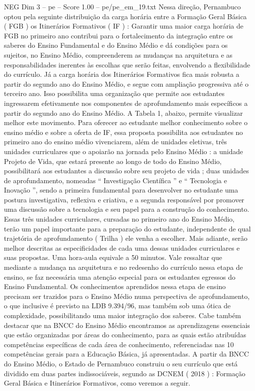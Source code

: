 \begin{textsample}{NEG Dim 3 – pe – Score 1.00 – pe/pe\_em\_19.txt}
Nessa direção, Pernambuco optou pela seguinte distribuição da carga horária entre a Formação Geral Básica ( FGB ) os Itinerários Formativos ( IF ) : Garantir uma maior carga horária de FGB no primeiro ano contribui para o fortalecimento da integração entre os saberes do Ensino Fundamental e do Ensino Médio e dá condições para os sujeitos, no Ensino Médio, compreenderem as mudanças na arquitetura e as responsabilidades inerentes às escolhas que serão feitas, envolvendo a flexibilidade do currículo.
Já a carga horária dos Itinerários Formativos fica mais robusta a partir do segundo ano do Ensino Médio, e segue com ampliação progressiva até o terceiro ano.
Isso possibilita uma organização que permite aos estudantes ingressarem efetivamente nos componentes de aprofundamento mais específicos a partir do segundo ano do Ensino Médio.
A Tabela 1, abaixo, permite visualizar melhor este movimento.
Para oferecer ao estudante melhor conhecimento sobre o ensino médio e sobre a oferta de IF, essa proposta possibilita aos estudantes no primeiro ano do ensino médio vivenciarem, além de unidades eletivas, três unidades curriculares que o apoiarão na jornada pelo Ensino Médio : a unidade Projeto de Vida, que estará presente ao longo de todo do Ensino Médio, possibilitará aos estudantes a discussão sobre seu projeto de vida ; duas unidades de aprofundamento, nomeadas “ Investigação Científica ” e “ Tecnologia e Inovação ”, sendo a primeira fundamental para desenvolver no estudante uma postura investigativa, reflexiva e criativa, e a segunda responsável por promover uma discussão sobre a tecnologia e seu papel para a construção do conhecimento.
Essas três unidades curriculares, cursadas no primeiro ano do Ensino Médio, terão um papel importante para a preparação do estudante, independente de qual trajetória de aprofundamento ( Trilha ) ele venha a escolher.
Mais adiante, serão melhor descritas as especificidades de cada uma dessas unidades curriculares e suas propostas.
Uma hora-aula equivale a 50 minutos.
Vale ressaltar que mediante a mudança na arquitetura e no redesenho do currículo nessa etapa de ensino, se faz necessária uma atenção especial para os estudantes egressos do Ensino Fundamental.
Os conhecimentos aprendidos nessa etapa de ensino precisam ser trazidos para o Ensino Médio numa perspectiva de aprofundamento, o que inclusive é previsto na LDB 9.394/96, mas também sob uma ótica de complexidade, possibilitando uma maior integração dos saberes.
Cabe também destacar que na BNCC do Ensino Médio encontramos as aprendizagens essenciais que estão organizadas por áreas do conhecimento, para as quais estão atribuídas competências específicas de cada área de conhecimento, referenciadas nas 10 competências gerais para a Educação Básica, já apresentadas.
A partir da BNCC do Ensino Médio, o Estado de Pernambuco construiu o seu currículo que está dividido em duas partes indissociáveis, segundo as DCNEM ( 2018 ) : Formação Geral Básica e Itinerários Formativos, como veremos a seguir.

\end{textsample}
